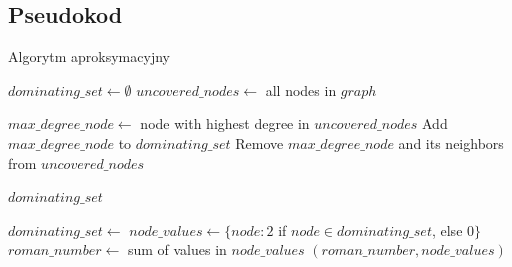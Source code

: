 \subsection{Pseudokod}
\begin{algorithm}
    \caption{Algorytm aproksymacyjny}
    \begin{algorithmic}[1]
    
            \State $dominating\_set \gets \emptyset$
            \State $uncovered\_nodes \gets$ all nodes in $graph$
            
                \State $max\_degree\_node \gets$ node with highest degree in $uncovered\_nodes$
                \State Add $max\_degree\_node$ to $dominating\_set$
                \State Remove $max\_degree\_node$ and its neighbors from $uncovered\_nodes$
            \EndWhile
            
            \State \Return $dominating\_set$
        \EndFunction
    
            \State $dominating\_set \gets$ 
            \State $node\_values \gets \{node: 2$ if $node \in dominating\_set$, else $0\}$
            \State $roman\_number \gets$ sum of values in $node\_values$
            \State \Return $(roman\_number, node\_values)$
        \EndFunction
    
    \end{algorithmic}
    \end{algorithm}

